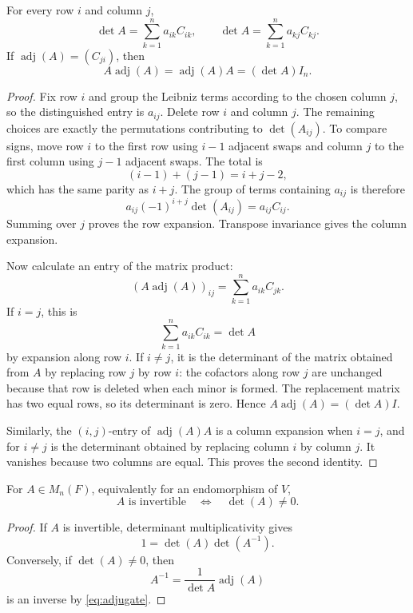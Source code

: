 \begin{theorem}\label{thm:adjugate}
For every row \(i\) and column \(j\),
\[
\det A=\sum_{k=1}^n a_{ik}C_{ik},
\qquad
\det A=\sum_{k=1}^n a_{kj}C_{kj}.
\]
If \(\operatorname{adj}(A)=(C_{ji})\), then
\begin{equation}\label{eq:adjugate}
A\operatorname{adj}(A)=\operatorname{adj}(A)A=(\det A)I_n.
\end{equation}
\end{theorem}
\begin{proof}
Fix row \(i\) and group the Leibniz terms according to the chosen column
\(j\), so the distinguished entry is \(a_{ij}\).  Delete row \(i\) and
column \(j\).  The remaining choices are exactly the permutations contributing
to \(\det(A_{ij})\).  To compare signs, move row \(i\) to the first row using
\(i-1\) adjacent swaps and column \(j\) to the first column using \(j-1\)
adjacent swaps.  The total is
\[
(i-1)+(j-1)=i+j-2,
\]
which has the same parity as \(i+j\).  The group of terms containing
\(a_{ij}\) is therefore
\[
a_{ij}(-1)^{i+j}\det(A_{ij})=a_{ij}C_{ij}.
\]
Summing over \(j\) proves the row expansion.  Transpose invariance gives the
column expansion.

Now calculate an entry of the matrix product:
\[
(A\operatorname{adj}(A))_{ij}
=\sum_{k=1}^n a_{ik}C_{jk}.
\]
If \(i=j\), this is
\[
\sum_{k=1}^n a_{ik}C_{ik}=\det A
\]
by expansion along row \(i\).  If \(i\ne j\), it is the determinant of the
matrix obtained from \(A\) by replacing row \(j\) by row \(i\): the cofactors
along row \(j\) are unchanged because that row is deleted when each minor is
formed.  The replacement matrix has two equal rows, so its determinant is
zero.  Hence \(A\operatorname{adj}(A)=(\det A)I\).

Similarly, the \((i,j)\)-entry of \(\operatorname{adj}(A)A\) is a column
expansion when \(i=j\), and for \(i\ne j\) is the determinant obtained by
replacing column \(i\) by column \(j\).  It vanishes because two columns are
equal.  This proves the second identity.
\end{proof}

\begin{corollary}\label{cor:field-det-invertibility}
For \(A\in M_n(F)\), equivalently for an endomorphism of \(V\),
\[
A\text{ is invertible}\quad\Longleftrightarrow\quad\det(A)\ne0.
\]
\end{corollary}
\begin{proof}
If \(A\) is invertible, determinant multiplicativity gives
\[
1=\det(A)\det(A^{-1}).
\]
Conversely, if \(\det(A)\ne0\), then
\[
A^{-1}=\frac1{\det A}\operatorname{adj}(A)
\]
is an inverse by
\eqref{eq:adjugate}.
\end{proof}

